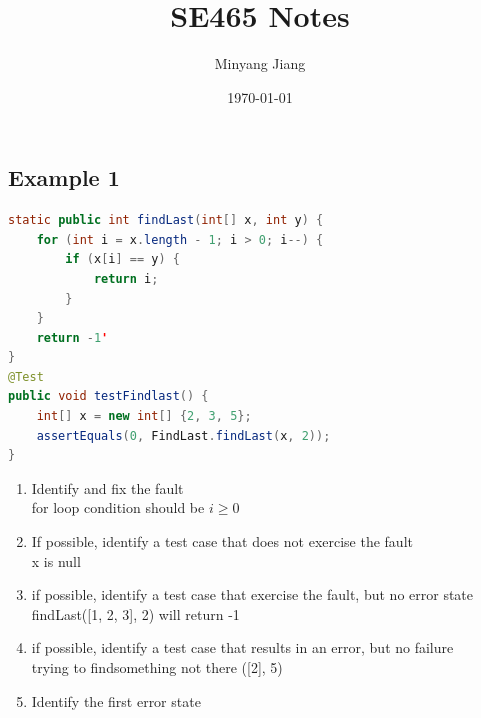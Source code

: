 \documentclass[10pt,usletter]{article}
\title{\huge SE465 Notes}
\author{Minyang Jiang}
\date{\today}
\newcommand{\NP}{\newpage \vspace*{-0.4in}}
\newcommand{\tab}[1][1cm]{\hspace*{#1}}
\begin{document}
\maketitle
\NP
\subsection{Example 1}
\begin{lstlisting}[language=Java]
static public int findLast(int[] x, int y) {
	for (int i = x.length - 1; i > 0; i--) {
		if (x[i] == y) {
			return i;
		}
	}
	return -1'
}
@Test
public void testFindlast() {
	int[] x = new int[] {2, 3, 5};
	assertEquals(0, FindLast.findLast(x, 2));
}
\end{lstlisting}
\begin{enumerate}
\item Identify and fix the fault \\
\tab for loop condition should be $i \geq 0$
\item If possible, identify a test case that does not exercise the fault \\
\tab x is null
\item if possible, identify a test case that exercise the fault, but no error state \\
\tab findLast([1, 2, 3], 2) will return -1
\item if possible, identify a test case that results in an error, but no failure \\
\tab trying to findsomething not there ([2], 5)
\item Identify the first error state
\end{enumerate}
\end{document}

